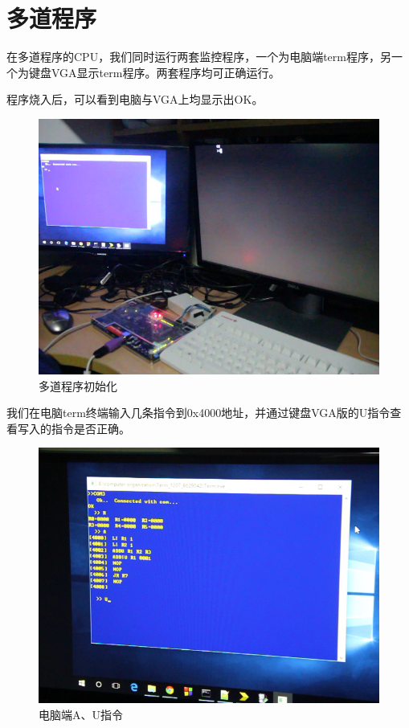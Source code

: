 \section{多道程序}

在多道程序的CPU，我们同时运行两套监控程序，一个为电脑端term程序，另一个为键盘VGA显示term程序。两套程序均可正确运行。

程序烧入后，可以看到电脑与VGA上均显示出OK。

\begin{figure}[H]
  \centering
  \includegraphics[width=4.5in]{Figures/picture/vlcsnap-2015-12-10-00h17m16s488.png}
  \caption{多道程序初始化}
\end{figure}

我们在电脑term终端输入几条指令到0x4000地址，并通过键盘VGA版的U指令查看写入的指令是否正确。

\begin{figure}[H]
  \centering
  \includegraphics[width=4.5in]{Figures/picture/vlcsnap-2015-12-10-00h17m47s086.png}
  \caption{电脑端A、U指令}
\end{figure}

